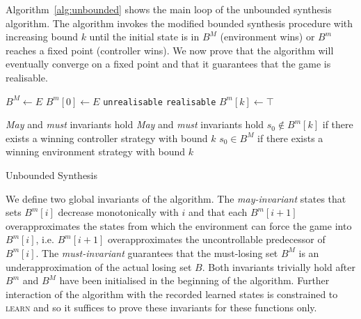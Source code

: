 Algorithm~\ref{alg:unbounded} shows the main loop of the unbounded synthesis algorithm.  The algorithm invokes the modified bounded synthesis procedure with increasing bound $k$ until the initial state is in $B^M$ (environment wins) or $B^m$ reaches a fixed point (controller wins). We now prove that the algorithm will eventually converge on a fixed point and that it guarantees that the game is realisable.

\begin{algorithm}[h]
    \begin{algorithmic}[1]
            \State $B^M \gets E$
            \State $B^m[0] \gets E$
                    \State \Return \texttt{unrealisable} 
                \EndIf
                    \State \Return \texttt{realisable} 
                \EndIf
                \State $B^m[k] \gets \top$
                \State {}
            \EndFor
        \EndFunction
    \end{algorithmic}

    \begin{algorithmic}
        \Require \emph{May} and \emph{must} invariants hold
        \Ensure \emph{May} and \emph{must} invariants hold
        \Ensure $s_0 \not\in B^m[k]$ if there exists a winning controller strategy with bound $k$
        \Ensure $s_0 \in B^M$ if there exists a winning environment strategy with bound $k$
            \State \Return {}
        \EndFunction
    \end{algorithmic}
    \caption{Unbounded Synthesis}
    \label{alg:unbounded}
\end{algorithm}

We define two global invariants of the algorithm.  The \emph{may-invariant} states that sets $B^m[i]$ decrease monotonically with $i$ and that each $B^m[i+1]$ overapproximates the states from which the environment can force the game into $B^m[i]$, i.e. $B^m[i+1]$ overapproximates the uncontrollable predecessor of $B^m[i]$.  The \emph{must-invariant} guarantees that the must-losing set $B^M$ is an underapproximation of the actual losing set $B$.  Both invariants trivially hold after $B^m$ and $B^M$ have been initialised in the beginning of the algorithm.  Further interaction of the algorithm with the recorded learned states is constrained to \textsc{learn} and  so it suffices to prove these invariants for these functions only.

